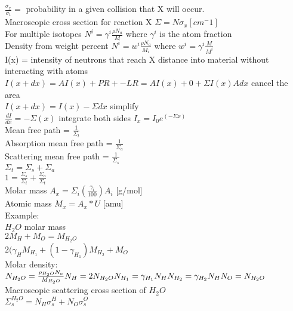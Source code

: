 \documentclass[12pt,fleqn, parskip=full]{scrartcl}
\begin{document}
$\frac{\sigma_x}{\sigma_t} =$ probability in a given collision that X will occur.\\
Macroscopic cross section for reaction X $\Sigma = N \sigma_x [cm^-1]$ \\

For multiple isotopes $N^i = \gamma^i \frac{\rho N_a}{M}$ where $\gamma^i$ is the atom fraction\\
Density from weight percent $N^i = w^i \frac{\rho N_a}{M_i}$ where $w^i = \gamma^i \frac{M}{M^i}$\\
I(x) = intensity of neutrons that reach X distance into material without interacting with atoms \\
$I(x + dx) = AI(x) + PR + -LR = AI(x) + 0 + \Sigma I(x)Adx$ cancel the area \\
$I(x + dx) = I(x) - \Sigma dx$ simplify \\
$\frac{dI}{dx} = - \Sigma (x)$ integrate both sides $ I_x = I_0e^{(-\Sigma x)} $\\
Mean free path = $\frac{1}{\Sigma_t}$\\
Absorption mean free path = $\frac{1}{\Sigma_a}$\\
Scattering mean free path = $\frac{1}{\Sigma_s}$\\
$\Sigma_t = \Sigma_s + \Sigma_a$\\
$1 = \frac{\Sigma_s}{\Sigma_t} + \frac{\Sigma_a}{\Sigma_t}$\\

Molar mass $A_x = \Sigma_i (\frac{\gamma_i}{100})A_i$ [g/mol] \\
Atomic mass $M_x = A_x * U$ [amu]\\

Example:\\
$H_2O$ molar mass\\
$2M_H + M_O = M_{H_2O}$\\
$2(\gamma_H M_{H_1} + (1 - \gamma_{H_1})M_{H_2} + M_O$\\
Molar density:\\
$N_{H_2O} = \frac{\rho_{H_2O} N_a}{M_{H_2O}}\\
N_H = 2N_{H_2O}\\
N_{H_1} = \gamma_{H_1} N_H\\
N_{H_2} = \gamma_{H_2} N_H\\
N_O = N_{H_2O}\\ $
Macroscopic scattering cross section of $H_2O$\\
$ \Sigma^{H_2O}_s = N_H \sigma_s^H + N_O \sigma_s^O$ \\
\end{document}
